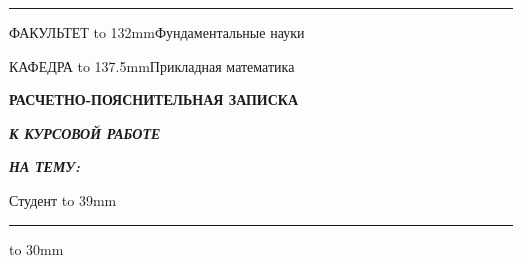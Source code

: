 {{\vspace*{2pt}

\hrule

}


\vspace*{9mm}

\noindent ФАКУЛЬТЕТ \rlap{\rule[-1.2mm]{132mm}{0.2mm}}\hbox to 132mm{\hfill Фундаментальные науки \hfill}

\medskip

\noindent КАФЕДРА \rlap{\rule[-1.2mm]{137.5mm}{0.2mm}}\hbox to 137.5mm{\hfill Прикладная математика \hfill}

\vspace*{2cm}

\centerline{\fontsize{18}{20pt}\selectfont\textbf{РАСЧЕТНО-ПОЯСНИТЕЛЬНАЯ ЗАПИСКА}}

\vspace*{5mm}

\centerline{\fontsize{17}{20pt}\selectfont\textit{\textbf{К КУРСОВОЙ РАБОТЕ}}}

\vspace*{5mm}

\centerline{\fontsize{17}{20pt}\selectfont\textit{\textbf{НА ТЕМУ:}}}

\begin{center}
\fontsize{18}{24pt}\selectfont\textit{\textbf{\@title}}
\end{center}

\vfill

\noindent\begin{minipage}{55mm}
\small
\noindent Студент \rlap{\rule[-1.2mm]{39mm}{0.2mm}}\hbox to 39mm{\hfill \@group \hfill}

\noindent \phantom{Студент} 

\vspace*{3.5mm}


\vspace*{10mm}


\vspace*{5mm}

\end{minipage}
\rule{20mm}{0pt}
\begin{minipage}{79mm}
\noindent\rlap{\rule[-1.2mm]{30mm}{0.2mm}}\hbox to 30mm{\hfill} \quad \rlap{\rule[-1.2mm]{47mm}{0.2mm}}{\rule{3mm}{0pt}\@author}


\end{minipage}}
